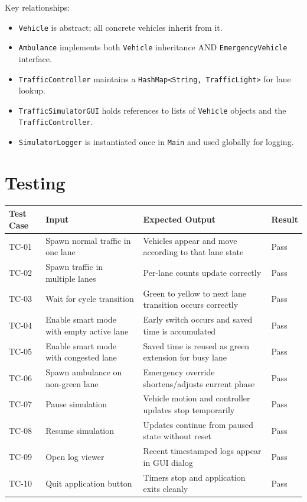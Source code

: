 \documentclass[12pt,a4paper]{article}
\begin{document}
Key relationships:
\begin{itemize}
    \item \texttt{Vehicle} is abstract; all concrete vehicles inherit from it.
    \item \texttt{Ambulance} implements both \texttt{Vehicle} inheritance AND \texttt{EmergencyVehicle} interface.
    \item \texttt{TrafficController} maintains a \texttt{HashMap<String, TrafficLight>} for lane lookup.
    \item \texttt{TrafficSimulatorGUI} holds references to lists of \texttt{Vehicle} objects and the \texttt{TrafficController}.
    \item \texttt{SimulatorLogger} is instantiated once in \texttt{Main} and used globally for logging.
\end{itemize}


\section{Testing}
\begin{table}[h]
    \centering
    \begin{tabularx}{\textwidth}{|l|X|X|l|}
        \hline
        \textbf{Test Case} & \textbf{Input} & \textbf{Expected Output} & \textbf{Result} \\ \hline
        TC-01 & Spawn normal traffic in one lane & Vehicles appear and move according to that lane state & Pass \\ \hline
        TC-02 & Spawn traffic in multiple lanes & Per-lane counts update correctly & Pass \\ \hline
        TC-03 & Wait for cycle transition & Green to yellow to next lane transition occurs correctly & Pass \\ \hline
        TC-04 & Enable smart mode with empty active lane & Early switch occurs and saved time is accumulated & Pass \\ \hline
        TC-05 & Enable smart mode with congested lane & Saved time is reused as green extension for busy lane & Pass \\ \hline
        TC-06 & Spawn ambulance on non-green lane & Emergency override shortens/adjusts current phase & Pass \\ \hline
        TC-07 & Pause simulation & Vehicle motion and controller updates stop temporarily & Pass \\ \hline
        TC-08 & Resume simulation & Updates continue from paused state without reset & Pass \\ \hline
        TC-09 & Open log viewer & Recent timestamped logs appear in GUI dialog & Pass \\ \hline
        TC-10 & Quit application button & Timers stop and application exits cleanly & Pass \\ \hline
    \end{tabularx}
\end{table}
\end{document}
